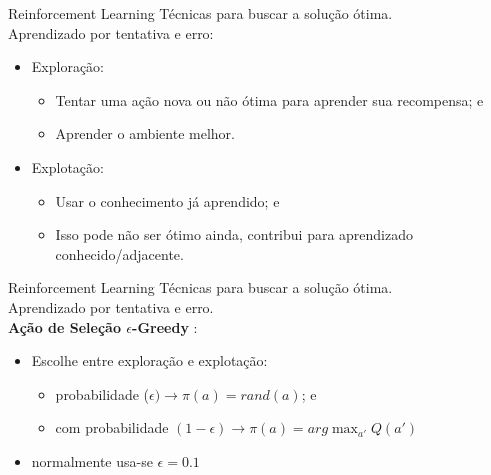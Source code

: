 \begin{frame}{Reinforcement Learning}
    Técnicas para buscar a solução ótima.\\
    \vspace{7}
    Aprendizado por tentativa e erro:
    \begin{itemize}
        \item \alert{Exploração}:
        \begin{itemize}
            \item Tentar uma ação nova ou não ótima para aprender sua recompensa; e
            \item Aprender o ambiente melhor.
        \end{itemize}
        \item \alert{Explotação}:
        \begin{itemize}
            \item Usar o conhecimento já aprendido; e
            \item Isso pode não ser ótimo ainda, contribui para aprendizado conhecido/adjacente.
        \end{itemize}
    \end{itemize}
\end{frame}

\begin{frame}{Reinforcement Learning}
    Técnicas para buscar a solução ótima.\\
    \vspace{7}
    Aprendizado por tentativa e erro.\\
    \vspace{7}
    \textbf{Ação de Seleção $\epsilon$-Greedy} \nocite{uniFreiburgDe}:
    \begin{itemize}
        \item Escolhe entre \alert{exploração} e \alert{explotação}:
        \begin{itemize}
            \item probabilidade ($\epsilon) \rightarrow \pi(a) = rand(a)$; e
            \item com probabilidade $(1 - \epsilon) \rightarrow \pi(a) = arg \max_{a'} Q(a')$
        \end{itemize}
        \item normalmente usa-se $\epsilon = 0.1$
    \end{itemize}    
\end{frame}

